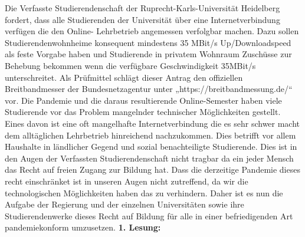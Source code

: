     {
        Die Verfasste Studierendenschaft der Ruprecht-Karls-Universität Heidelberg fordert,
        dass alle Studierenden der Universität über eine Internetverbindung verfügen die den
        Online- Lehrbetrieb angemessen verfolgbar machen. Dazu sollen
        Studierendenwohnheime konsequent mindestens 35 MBit/s Up/Downloadspeed als feste
        Vorgabe haben und Studierende in privatem Wohnraum Zuschüsse zur Behebung
        bekommen wenn die verfügbare Geschwindigkeit 35MBit/s unterschreitet. Als
        Prüfmittel schlägt dieser Antrag den offiziellen Breitbandmesser der
        Bundesnetzagentur
        unter „https://breitbandmessung.de/“ vor.
    }{
        Die Pandemie und die daraus resultierende Online-Semester haben viele Studierende vor
        das Problem mangelnder technischer Möglichkeiten gestellt. Eines davon ist eine oft
        mangelhafte Internetverbindung die es sehr schwer macht dem alltäglichen Lehrbetrieb
        hinreichend nachzukommen. Dies betrifft vor allem Haushalte in ländlicher Gegend und
        sozial benachteiligte Studierende. Dies ist in den Augen der Verfassten
        Studierendenschaft nicht tragbar da ein jeder Mensch das Recht auf freien Zugang zur
        Bildung hat. Dass die derzeitige Pandemie dieses recht einschränket ist in unseren Augen
        nicht zutreffend, da wir die technologischen Möglichkeiten haben das zu verhindern.
        Daher ist es nun die Aufgabe der Regierung und der einzelnen Universitäten sowie ihre
        Studierendenwerke dieses Recht auf Bildung für alle in einer befriedigenden Art
        pandemiekonform umzusetzen.
    }{
        \textbf{1. Lesung:}
        \ul{
        }
    }{
    }
